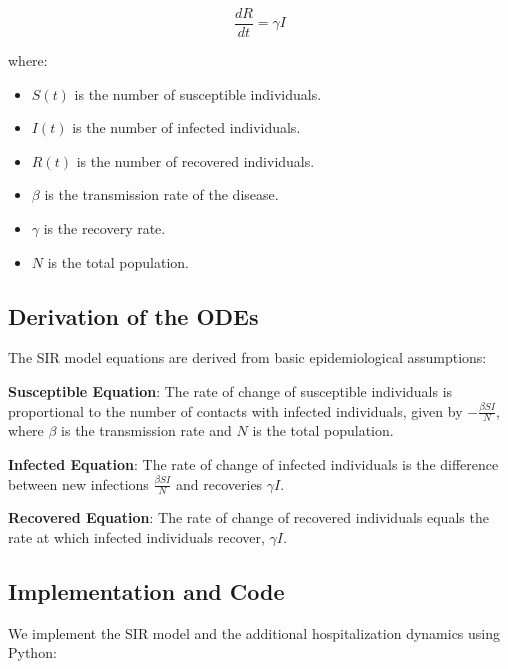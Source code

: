 \documentclass{article}
\begin{document}
\begin{equation}
\frac{dR}{dt} = \gamma I
\end{equation}

where:
\begin{itemize}
    \item \(S(t)\) is the number of susceptible individuals.
    \item \(I(t)\) is the number of infected individuals.
    \item \(R(t)\) is the number of recovered individuals.
    \item \(\beta\) is the transmission rate of the disease.
    \item \(\gamma\) is the recovery rate.
    \item \(N\) is the total population.
\end{itemize}

\subsection{Derivation of the ODEs}
The SIR model equations are derived from basic epidemiological assumptions:

\textbf{Susceptible Equation}: The rate of change of susceptible individuals is proportional to the number of contacts with infected individuals, given by \(-\frac{\beta S I}{N}\), where \(\beta\) is the transmission rate and \(N\) is the total population.

\textbf{Infected Equation}: The rate of change of infected individuals is the difference between new infections \(\frac{\beta S I}{N}\) and recoveries \(\gamma I\).

\textbf{Recovered Equation}: The rate of change of recovered individuals equals the rate at which infected individuals recover, \(\gamma I\).

\subsection{Implementation and Code}
We implement the SIR model and the additional hospitalization dynamics using Python:
\end{document}
